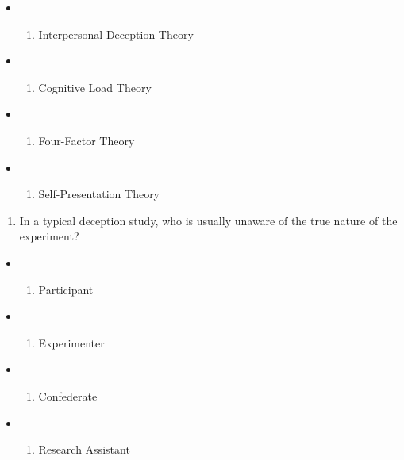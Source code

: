 \documentclass[
  letterpaper,
  DIV=11,
  numbers=noendperiod]{scrreprt}
\providecommand{\tightlist}{%
  \setlength{\itemsep}{0pt}\setlength{\parskip}{0pt}}\usepackage{longtable,booktabs,array}
\begin{document}
\begin{itemize}
\tightlist
\item
  \begin{enumerate}
  \def\labelenumi{(\Alph{enumi})}
  \tightlist
  \item
    Interpersonal Deception Theory\\
  \end{enumerate}
\item
  \begin{enumerate}
  \def\labelenumi{(\Alph{enumi})}
  \setcounter{enumi}{1}
  \tightlist
  \item
    Cognitive Load Theory\\
  \end{enumerate}
\item
  \begin{enumerate}
  \def\labelenumi{(\Alph{enumi})}
  \setcounter{enumi}{2}
  \tightlist
  \item
    Four-Factor Theory\\
  \end{enumerate}
\item
  \begin{enumerate}
  \def\labelenumi{(\Alph{enumi})}
  \setcounter{enumi}{3}
  \tightlist
  \item
    Self-Presentation Theory
  \end{enumerate}
\end{itemize}

\begin{enumerate}
\def\labelenumi{\arabic{enumi}.}
\setcounter{enumi}{2}
\tightlist
\item
  In a typical deception study, who is usually unaware of the true
  nature of the experiment?
\end{enumerate}

\begin{itemize}
\tightlist
\item
  \begin{enumerate}
  \def\labelenumi{(\Alph{enumi})}
  \tightlist
  \item
    Participant\\
  \end{enumerate}
\item
  \begin{enumerate}
  \def\labelenumi{(\Alph{enumi})}
  \setcounter{enumi}{1}
  \tightlist
  \item
    Experimenter\\
  \end{enumerate}
\item
  \begin{enumerate}
  \def\labelenumi{(\Alph{enumi})}
  \setcounter{enumi}{2}
  \tightlist
  \item
    Confederate\\
  \end{enumerate}
\item
  \begin{enumerate}
  \def\labelenumi{(\Alph{enumi})}
  \setcounter{enumi}{3}
  \tightlist
  \item
    Research Assistant
  \end{enumerate}
\end{itemize}
\end{document}
